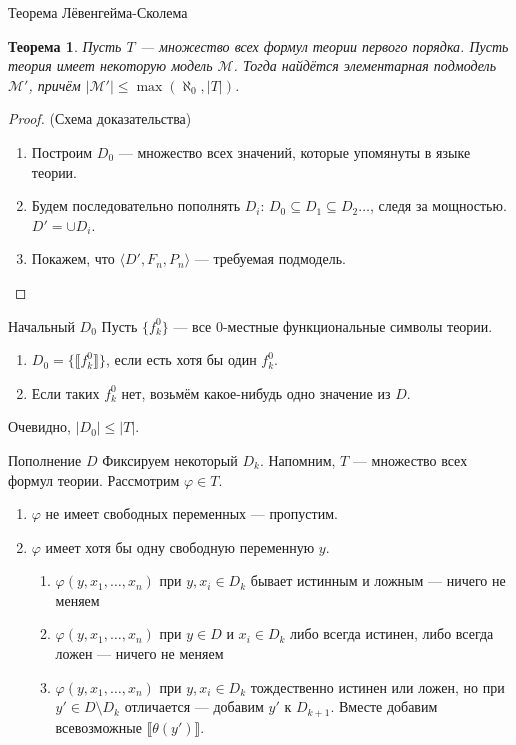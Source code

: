 \documentclass[aspectratio=169]{beamer}
\newtheorem{thm}{Теорема}[section]
\begin{document}
\begin{frame}{Теорема Лёвенгейма-Сколема}
\begin{thm}Пусть $T$ --- множество всех формул теории первого порядка. 
Пусть теория имеет некоторую модель $\mathcal{M}$.
Тогда найдётся элементарная подмодель $\mathcal{M'}$, причём $|\mathcal{M'}| \leq \max(\aleph_0, |T|)$.
\end{thm}\pause

\begin{proof} (Схема доказательства)
\begin{enumerate} 
\item Построим $D_0$ --- множество всех значений, которые упомянуты в языке теории. \pause
\item Будем последовательно пополнять $D_i$: $D_0 \subseteq D_1 \subseteq D_2 \dots$, следя за мощностью.
$D' = \cup D_i$.
\item Покажем, что $\langle D', F_n, P_n\rangle$ --- требуемая подмодель.
\end{enumerate}
\end{proof}
\end{frame}

\begin{frame}{Начальный $D_0$}
Пусть $\{f^0_k\}$ --- все 0-местные функциональные символы теории. \pause
\begin{enumerate}
\item $D_0 = \{ \llbracket f^0_k \rrbracket \}$, если есть хотя бы один $f^0_k$. \pause
\item Если таких $f^0_k$ нет, возьмём какое-нибудь одно значение из $D$. \pause
\end{enumerate}\pause

Очевидно, $|D_0| \le |T|$.
\end{frame}

\begin{frame}{Пополнение $D$}
Фиксируем некоторый $D_k$. Напомним, $T$ --- множество всех формул теории. Рассмотрим $\varphi \in T$.\pause
\begin{enumerate}
\item $\varphi$ не имеет свободных переменных --- пропустим. \pause
\item $\varphi$ имеет хотя бы одну свободную переменную $y$. \pause
\begin{enumerate}
\item $\varphi (y, x_1, \dots, x_n)$ при $y,x_i \in D_k$ бывает истинным и ложным --- ничего не меняем \pause
\item $\varphi (y, x_1, \dots, x_n)$ при $y \in D$ и $x_i \in D_k$ либо всегда истинен, либо всегда ложен --- ничего не меняем \pause
\item $\varphi (y, x_1, \dots, x_n)$ при $y,x_i \in D_k$ тождественно истинен или ложен, но при 
$y' \in D \setminus D_k$ отличается --- добавим $y'$ к $D_{k+1}$. \pause
Вместе добавим всевозможные $\llbracket\theta(y')\rrbracket$.
\end{enumerate}
\end{enumerate}\pause

\end{frame}
\end{document}
